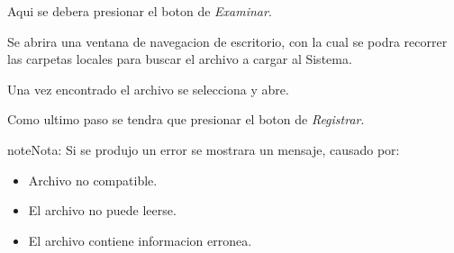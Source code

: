 \documentclass[a4paper,10pt,spanish]{sphinxmanual}
\begin{document}

Aqui se debera presionar el boton de \emph{Examinar}.


Se abrira una ventana de navegacion de escritorio, con la cual se podra recorrer las carpetas locales para buscar el archivo a cargar al Sistema.


Una vez encontrado el archivo se selecciona y abre.


Como ultimo paso se tendra que presionar el boton de \emph{Registrar}.


\begin{notice}{note}{Nota:}
Si se produjo un error se mostrara un mensaje, causado por:
\begin{itemize}
\item {} 
Archivo no compatible.

\item {} 
El archivo no puede leerse.

\item {} 
El archivo contiene informacion erronea.

\end{itemize}

\end{notice}



\renewcommand{\indexname}{Índice}
\printindex
\end{document}
